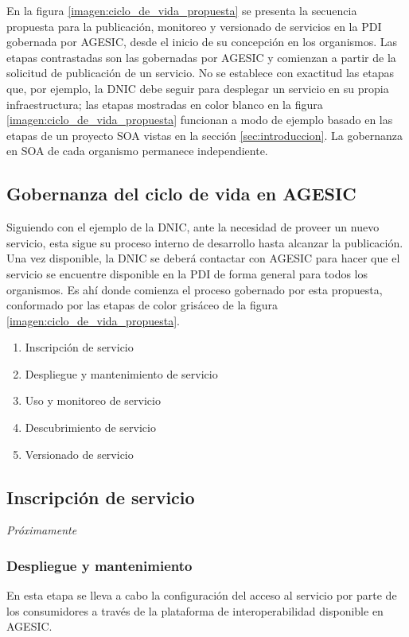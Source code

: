 \documentclass[11pt]{article}
\begin{document}
			En la figura \ref{imagen:ciclo_de_vida_propuesta} se presenta la secuencia propuesta para la publicación, monitoreo y versionado de servicios en la PDI gobernada por AGESIC, desde el inicio de su concepción en los organismos. Las etapas contrastadas son las gobernadas por AGESIC y comienzan a partir de la solicitud de publicación de un servicio. No se establece con exactitud las etapas que, por ejemplo, la DNIC debe seguir para desplegar un servicio en su propia infraestructura; las etapas mostradas en color blanco en la figura \ref{imagen:ciclo_de_vida_propuesta} funcionan a modo de ejemplo basado en las etapas de un proyecto SOA vistas en la sección \ref{sec:introduccion}. La gobernanza en SOA de cada organismo permanece independiente.

		\subsection{Gobernanza del ciclo de vida en AGESIC}
			\label{sec:ciclo_de_vida_en_agesic}

			Siguiendo con el ejemplo de la DNIC, ante la necesidad de proveer un nuevo servicio, esta sigue su proceso interno de desarrollo hasta alcanzar la publicación. Una vez disponible, la DNIC se deberá contactar con AGESIC para hacer que el servicio se encuentre disponible en la PDI de forma general para todos los organismos. Es ahí donde comienza el proceso gobernado por esta propuesta, conformado por las etapas de color grisáceo de la figura \ref{imagen:ciclo_de_vida_propuesta}.

			\begin{enumerate}
				\item Inscripción de servicio
				\item Despliegue y mantenimiento de servicio
				\item Uso y monitoreo de servicio
				\item Descubrimiento de servicio
				\item Versionado de servicio
			\end{enumerate}

			\subsection{Inscripción de servicio}
				\emph{Próximamente}

			\subsubsection{Despliegue y mantenimiento}
				En esta etapa se lleva a cabo la configuración del acceso al servicio por parte de los consumidores a través de la plataforma de interoperabilidad disponible en AGESIC.
\end{document}
